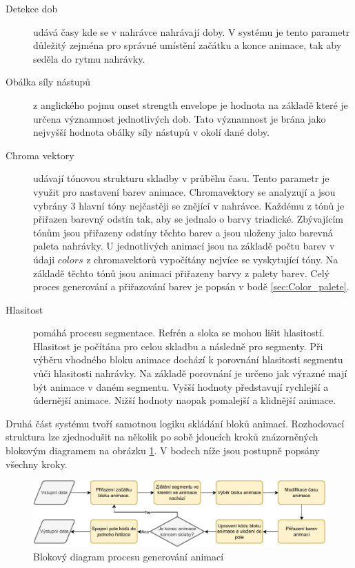 \begin{description}
    \item[Detekce dob] udává časy kde se v nahrávce nahrávají doby. V systému je tento parametr důležitý zejména pro správné umístění začátku a konce animace, tak aby seděla do rytmu nahrávky. 

    \item[Obálka síly nástupů] z anglického pojmu onset strength envelope je hodnota na základě které je určena významnost jednotlivých dob. Tato významnost je brána jako nejvyšší hodnota obálky síly nástupů v okolí dané doby.
     
    \item[Chroma vektory] udávají tónovou strukturu skladby v průběhu času. Tento parametr je využit pro nastavení barev animace. Chromavektory se analyzují a jsou vybrány 3 hlavní tóny nejčastěji se znějící v nahrávce. Každému z tónů je přiřazen barevný odstín tak, aby se jednalo o barvy triadické. Zbývajícím tónům jsou přiřazeny odstíny těchto barev a jsou uloženy jako barevná paleta nahrávky. U jednotlivých animací jsou na základě počtu barev v údaji $colors$ z chromavektorů vypočítány nejvíce se vyskytující tóny. Na základě těchto tónů jsou animaci přiřazeny barvy z palety barev. Celý proces generování a přiřazování barev je popsán v bodě \ref{sec:Color_palete}.

    \item[Hlasitost] pomáhá procesu segmentace. Refrén a sloka se mohou lišit hlasitostí. Hlasitost je počítána pro celou skladbu a následně pro segmenty. Při výběru vhodného bloku animace dochází k porovnání hlasitosti segmentu vůči hlasitosti nahrávky. Na základě porovnání je určeno jak výrazné mají být animace v daném segmentu. Vyšší hodnoty představují rychlejší a údernější animace. Nižší hodnoty naopak pomalejší a klidnější animace.
\end{description}


Druhá část systému tvoří samotnou logiku skládání bloků animací. Rozhodovací struktura lze zjednodušit na několik po sobě jdoucích kroků znázorněných blokovým diagramem na obrázku \ref{fig:diagram_procesu_generovani_animaci}. V bodech níže jsou postupně popsány všechny kroky.

\begin{figure}[H]
    \centering
    \includegraphics[width = 1\linewidth]{obrazky/UML_diagramy_anim_generation_process.pdf}
    \caption{Blokový diagram procesu generování animací}
    \label{fig:diagram_procesu_generovani_animaci}
\end{figure}

